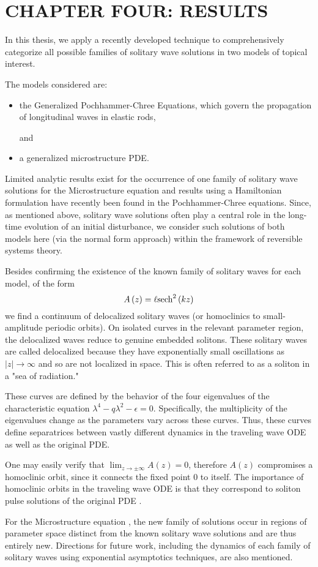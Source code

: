 \chapter{CHAPTER FOUR: RESULTS} \label{chapter_4}

In this thesis, we apply a recently developed technique to
comprehensively categorize all possible families of solitary wave
solutions in two models of topical interest.

The models considered are:
\begin{itemize}
\item the Generalized Pochhammer-Chree Equations, which  govern the propagation of longitudinal waves in elastic rods,

and

\item a generalized microstructure PDE.
\end{itemize}

Limited analytic results exist for the occurrence of one family of  solitary
wave solutions for the Microstructure equation and results using a Hamiltonian
formulation have recently been found in the Pochhammer-Chree equations. Since, as
mentioned above, solitary wave solutions often play a central role in the
long-time evolution of an initial disturbance, we consider such solutions of
both models here (via the normal form approach) within the framework of
reversible systems theory.

Besides confirming the existence of the known family of solitary waves for each
model, of the form
\begin{equation} 
A\left(z\right) = \ell \space \mathrm{sech}^2\left(k z\right)
\end{equation}
we find a continuum of delocalized solitary waves (or homoclinics to
small-amplitude periodic orbits).  On isolated curves in the relevant parameter
region, the delocalized waves reduce to genuine embedded solitons. 
These solitary waves are called delocalized because they have exponentially
small oscillations as $|z|\rightarrow\infty$ and so are not localized in space.
This is often referred to as a soliton in a "sea of radiation."

These curves are defined by the behavior of the four eigenvalues of the characteristic
equation $ \lambda^4 - q \lambda^2 - \epsilon =  0$. Specifically, the 
multiplicity of the eigenvalues change as the parameters vary across these curves.
Thus, these curves define separatrices between vastly different dynamics in 
the traveling wave ODE as well as the original PDE.


One may easily verify that $\lim_{z\rightarrow\pm\infty} A(z) = 0$, therefore
$A(z)$ compromises a homoclinic orbit, since it connects the fixed point $0$ to
itself. The importance of homoclinic orbits in the traveling wave ODE is that
they correspond to soliton pulse solutions of the original PDE \cite{IA}.

For the Microstructure equation , the new family of solutions occur in regions
of parameter space distinct from the known solitary wave solutions and are thus
entirely new.  Directions for future work, including the dynamics of each family
of solitary waves using exponential asymptotics techniques, are also mentioned.

